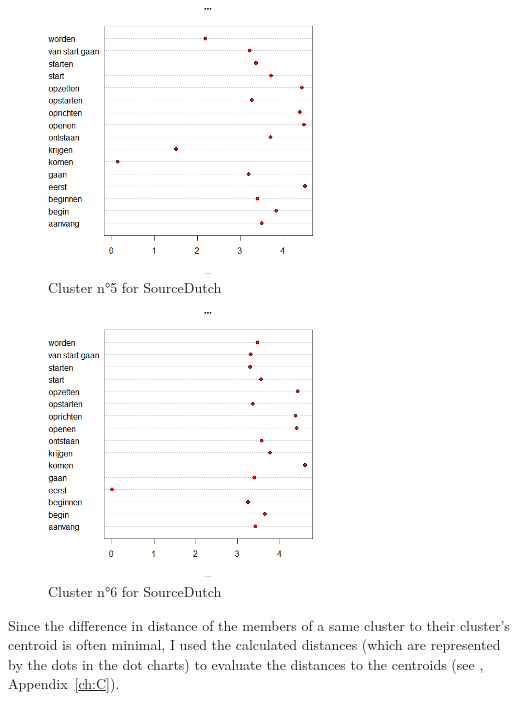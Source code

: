 \begin{figure}
\includegraphics[width=7cm]{figures/Vandevoorde2-img60.png}
\caption{\label{fig:4:60}Cluster n°5 for SourceDutch}
\end{figure}

\begin{figure}
\includegraphics[width=7cm]{figures/Vandevoorde2-img61.png}
\caption{\label{fig:4:61}Cluster n°6 for SourceDutch}
\end{figure}


Since the difference in distance of the members of a same cluster to their cluster’s centroid is often minimal, I used the calculated distances (which are represented by the dots in the dot charts) to evaluate the distances to the centroids (see , Appendix~\ref{ch:C}).

